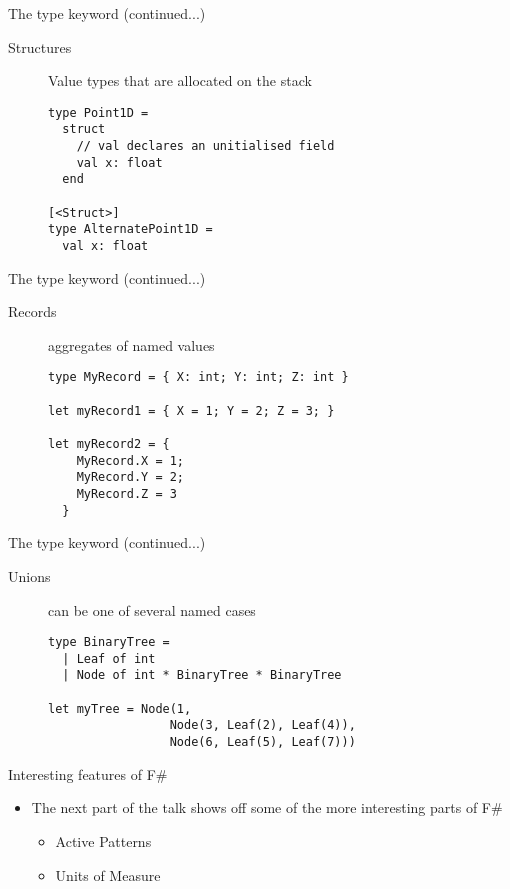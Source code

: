 \documentclass[landscape]{slides}
\begin{document}
\begin{slide}{The type keyword (continued...)}
\begin{description}
\item[Structures] Value types that are allocated on the stack 
\begin{verbatim}
type Point1D =
  struct 
    // val declares an unitialised field 
    val x: float
  end

[<Struct>]
type AlternatePoint1D = 
  val x: float
\end{verbatim}
\end{description}
\end{slide}

\begin{slide}{The type keyword (continued...)}
\begin{description}
\item[Records] aggregates of named values
\begin{verbatim}
type MyRecord = { X: int; Y: int; Z: int }

let myRecord1 = { X = 1; Y = 2; Z = 3; }

let myRecord2 = {
    MyRecord.X = 1; 
    MyRecord.Y = 2; 
    MyRecord.Z = 3 
  }
\end{verbatim}
\end{description}
\end{slide}

\begin{slide}{The type keyword (continued...)}
\begin{description}
\item[Unions] can be one of several named cases 
\begin{verbatim}
type BinaryTree =
  | Leaf of int
  | Node of int * BinaryTree * BinaryTree

let myTree = Node(1, 
                 Node(3, Leaf(2), Leaf(4)), 
                 Node(6, Leaf(5), Leaf(7)))
\end{verbatim}
\end{description}
\end{slide}

\begin{slide}{Interesting features of F\#}
\begin{itemize}
\item The next part of the talk shows off some of the more interesting parts of F\#
\begin{itemize}
\item Active Patterns
\item Units of Measure
\end{itemize}
\end{itemize}
\end{slide}
\end{document}
